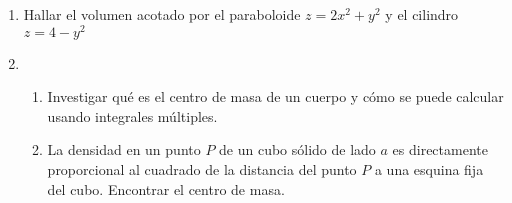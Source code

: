 \documentclass{article}
\begin{document}
\begin{enumerate}
{	
    }
    
   \item {
   Hallar el volumen acotado por el paraboloide $z = 2x^2 + y^2$ y el cilindro $z = 4 - y^2$\\

	
    }
    
   \item {
    \begin{enumerate}
	\item
	Investigar qué es el centro de masa de un cuerpo y cómo se puede calcular usando integrales múltiples.\\	
	
	
	\item    
	La densidad en un punto $P$ de un cubo sólido de lado $a$ es directamente proporcional al cuadrado de la distancia del punto $P$ a una esquina fija del cubo. Encontrar el centro de masa.\\    
    
    \end{enumerate}
    }
    
\end{enumerate}
\end{document}
